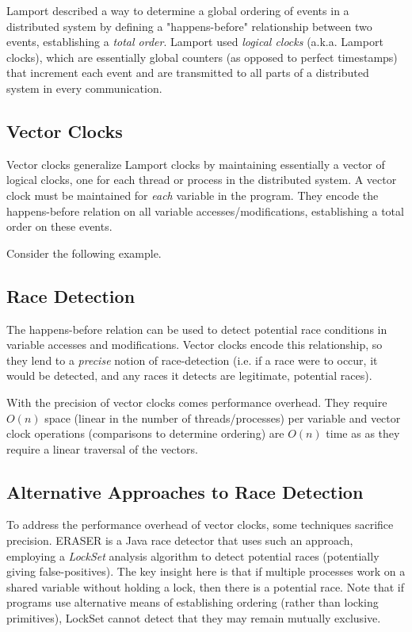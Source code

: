 \documentclass[twoside]{article}
\begin{document}
Lamport described a way to determine a global ordering of events in a
distributed system by defining a "happens-before" relationship between two
events, establishing a \emph{total order}. Lamport used \emph{logical clocks}
(a.k.a. Lamport clocks), which are essentially global counters (as opposed to
perfect timestamps) that increment each event and are transmitted to all parts
of a distributed system in every communication.

\subsection{Vector Clocks}
Vector clocks generalize Lamport clocks by maintaining essentially a vector of
logical clocks, one for each thread or process in the distributed system. A
vector clock must be maintained for \emph{each} variable in the program. They
encode the happens-before relation on all variable accesses/modifications,
establishing a total order on these events.

Consider the following example.

\subsection{Race Detection}
The happens-before relation can be used to detect potential race conditions in
variable accesses and modifications. Vector clocks encode this relationship, so
they lend to a \emph{precise} notion of race-detection (i.e. if a race were to
occur, it would be detected, and any races it detects are legitimate, potential
races).

With the precision of vector clocks comes performance overhead. They require
$O(n)$ space (linear in the number of threads/processes) per variable and vector
clock operations (comparisons to determine ordering) are $O(n)$ time as as they
require a linear traversal of the vectors.

\subsection{Alternative Approaches to Race Detection}
To address the performance overhead of vector clocks, some techniques sacrifice
precision. ERASER is a Java race detector that uses such an approach, employing
a \emph{LockSet} analysis algorithm to detect potential races (potentially
giving false-positives). The key insight here is that if multiple processes work
on a shared variable without holding a lock, then there is a potential race.
Note that if programs use alternative means of establishing ordering (rather
than locking primitives), LockSet cannot detect that they may remain mutually
exclusive.
\end{document}

